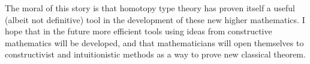 \documentclass{article}
\begin{document}
The moral of this story is that homotopy type theory has proven itself a useful (albeit not definitive) tool in the development of these new higher mathematics. I hope that in the future more efficient tools using ideas from constructive mathematics will be developed, and that mathematicians will open themselves to constructivist and intuitionistic methods as a way to prove new classical theorem.



\end{document}
